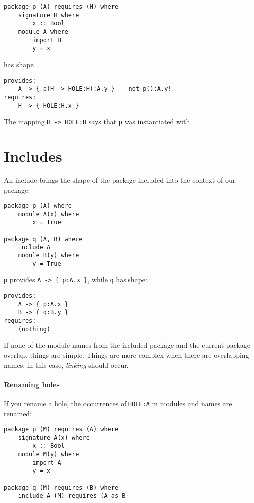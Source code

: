 \documentclass{article}
\begin{document}
\begin{verbatim}
package p (A) requires (H) where
    signature H where
        x :: Bool
    module A where
        import H
        y = x
\end{verbatim}

has shape

\begin{verbatim}
provides:
    A -> { p(H -> HOLE:H):A.y } -- not p():A.y!
requires:
    H -> { HOLE:H.x }
\end{verbatim}

The mapping \verb|H -> HOLE:H| says that \verb|p| was instantiated with

\section{Includes}

An include brings the shape of the package included into the context
of our package:

\begin{verbatim}
package p (A) where
    module A(x) where
        x = True

package q (A, B) where
    include A
    module B(y) where
        y = True
\end{verbatim}

\verb|p| provides \verb|A -> { p:A.x }|, while \verb|q| has shape:

\begin{verbatim}
provides:
    A -> { p:A.x }
    B -> { q:B.y }
requires:
    (nothing)
\end{verbatim}

If none of the module names from the included package and the
current package overlap, things are simple. Things are more
complex when there are overlapping names: in this case, \emph{linking}
should occur.

\paragraph{Renaming holes}

If you rename a hole, the occurrences of \verb|HOLE:A| in modules and names
are renamed:

\begin{verbatim}
package p (M) requires (A) where
    signature A(x) where
        x :: Bool
    module M(y) where
        import A
        y = x

package q (M) requires (B) where
    include A (M) requires (A as B)
\end{verbatim}
\end{document}
